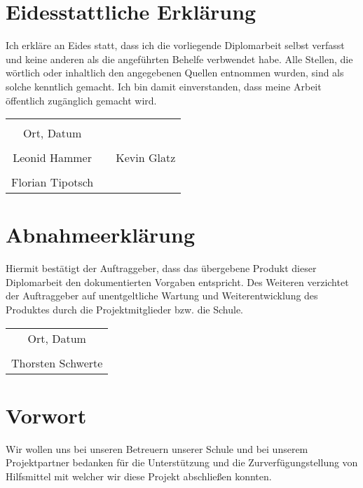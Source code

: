 \chapter*{Eidesstattliche Erklärung}
Ich erkläre an Eides statt, dass ich die vorliegende Diplomarbeit selbst verfasst und keine anderen als die angeführten Behelfe verbwendet habe. Alle Stellen, die wörtlich oder inhaltlich den angegebenen Quellen entnommen wurden, sind als solche kenntlich gemacht.
Ich bin damit einverstanden, dass meine Arbeit öffentlich zugänglich gemacht wird.

\vspace{1cm}
\begin{tabular}{c c c}
	& \hspace{4cm} & \\\cline{1-1}
	Ort, Datum & & \\
	\vspace{2cm}
	& & \\\cline{1-1}\cline{3-3}
	Leonid Hammer & & Kevin Glatz \\ 
	\vspace{2cm}
	& & \\\cline{1-1}
	 Florian Tipotsch
\end{tabular}

\chapter*{Abnahmeerklärung}
Hiermit bestätigt der Auftraggeber, dass das übergebene Produkt dieser Diplomarbeit den dokumentierten Vorgaben entspricht. Des Weiteren verzichtet der Auftraggeber auf unentgeltliche Wartung und Weiterentwicklung des Produktes durch die Projektmitglieder bzw. die Schule.

\vspace{1cm}
\begin{tabular}{c}
	\\\cline{1-1}
	Ort, Datum\\
	\vspace{2cm}
	\\\cline{1-1}
	Thorsten Schwerte
\end{tabular}	

\chapter*{Vorwort}
Wir wollen uns bei unseren Betreuern unserer Schule und bei unserem Projektpartner bedanken für die Unterstützung und die Zurverfügungstellung von Hilfsmittel mit welcher wir diese Projekt abschließen konnten.


